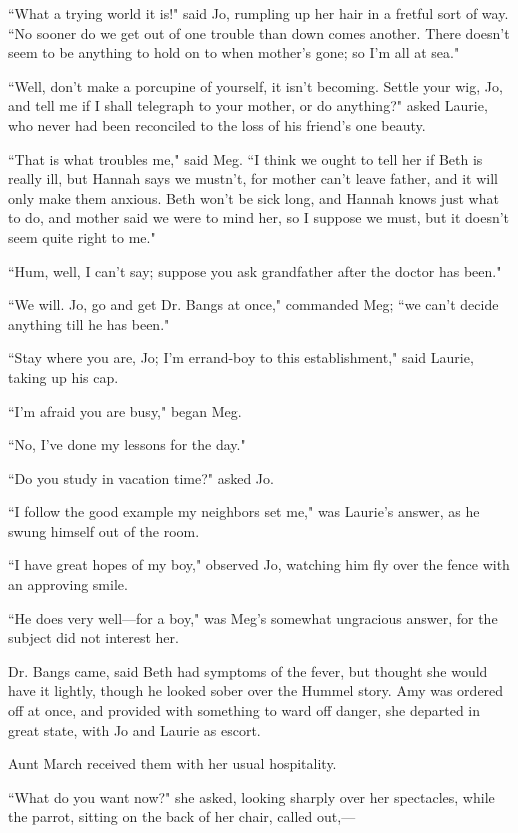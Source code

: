 ``What a trying world it is!" said Jo, rumpling up her hair in a fretful
sort of way. ``No sooner do we get out of one trouble than down comes
another. There doesn't seem to be anything to hold on to
when mother's gone; so I'm all at sea."

``Well, don't make a porcupine of yourself, it
isn't becoming. Settle your wig, Jo, and tell me if I
shall telegraph to your mother, or do anything?" asked Laurie, who never
had been reconciled to the loss of his friend's one
beauty.

``That is what troubles me," said Meg. ``I think we ought to tell her if
Beth is really ill, but Hannah says we mustn't, for
mother can't leave father, and it will only make them
anxious. Beth won't be sick long, and Hannah knows just
what to do, and mother said we were to mind her, so I suppose we must,
but it doesn't seem quite right to me."

``Hum, well, I can't say; suppose you ask grandfather
after the doctor has been."

``We will. Jo, go and get Dr. Bangs at once," commanded Meg; ``we
can't decide anything till he has been."

``Stay where you are, Jo; I'm errand-boy to this
establishment," said Laurie, taking up his cap.

``I'm afraid you are busy," began Meg.

``No, I've done my lessons for the day."

``Do you study in vacation time?" asked Jo.

``I follow the good example my neighbors set me," was
Laurie's answer, as he swung himself out of the room.

``I have great hopes of my boy," observed Jo, watching him fly over the
fence with an approving smile.

``He does very well---for a boy," was Meg's somewhat
ungracious answer, for the subject did not interest her.

Dr. Bangs came, said Beth had symptoms of the fever, but thought she
would have it lightly, though he looked sober over the Hummel story. Amy
was ordered off at once, and provided with something to ward off danger,
she departed in great state, with Jo and Laurie as escort.

Aunt March received them with her usual hospitality.

``What do you want now?" she asked, looking sharply over her spectacles,
while the parrot, sitting on the back of her chair, called out,---


